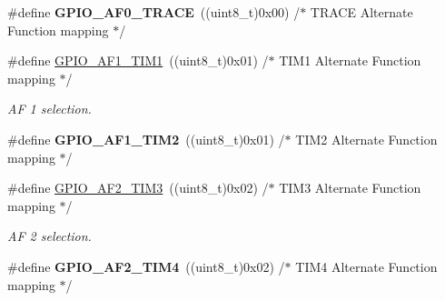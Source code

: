 \begin{DoxyCompactItemize}
\item 
\#define {\bfseries G\+P\+I\+O\+\_\+\+A\+F0\+\_\+\+T\+R\+A\+CE}~((uint8\+\_\+t)0x00)  /$\ast$ T\+R\+A\+C\+E Alternate Function mapping                          $\ast$/\hypertarget{group___g_p_i_o___alternate__function__selection_gab8c8f038d314b7bf2d62bce189d45877}{}\label{group___g_p_i_o___alternate__function__selection_gab8c8f038d314b7bf2d62bce189d45877}

\item 
\#define \hyperlink{group___g_p_i_o___alternate__function__selection_ga232695759304748cda241cc00e0680e5}{G\+P\+I\+O\+\_\+\+A\+F1\+\_\+\+T\+I\+M1}~((uint8\+\_\+t)0x01)  /$\ast$ T\+I\+M1 Alternate Function mapping $\ast$/\hypertarget{group___g_p_i_o___alternate__function__selection_ga232695759304748cda241cc00e0680e5}{}\label{group___g_p_i_o___alternate__function__selection_ga232695759304748cda241cc00e0680e5}

\begin{DoxyCompactList}\small\item\em AF 1 selection. \end{DoxyCompactList}\item 
\#define {\bfseries G\+P\+I\+O\+\_\+\+A\+F1\+\_\+\+T\+I\+M2}~((uint8\+\_\+t)0x01)  /$\ast$ T\+I\+M2 Alternate Function mapping $\ast$/\hypertarget{group___g_p_i_o___alternate__function__selection_ga4a124b0badec1580f1581a5fccd32ade}{}\label{group___g_p_i_o___alternate__function__selection_ga4a124b0badec1580f1581a5fccd32ade}

\item 
\#define \hyperlink{group___g_p_i_o___alternate__function__selection_ga41e7dab432740a5fff4084890764242f}{G\+P\+I\+O\+\_\+\+A\+F2\+\_\+\+T\+I\+M3}~((uint8\+\_\+t)0x02)  /$\ast$ T\+I\+M3 Alternate Function mapping $\ast$/\hypertarget{group___g_p_i_o___alternate__function__selection_ga41e7dab432740a5fff4084890764242f}{}\label{group___g_p_i_o___alternate__function__selection_ga41e7dab432740a5fff4084890764242f}

\begin{DoxyCompactList}\small\item\em AF 2 selection. \end{DoxyCompactList}\item 
\#define {\bfseries G\+P\+I\+O\+\_\+\+A\+F2\+\_\+\+T\+I\+M4}~((uint8\+\_\+t)0x02)  /$\ast$ T\+I\+M4 Alternate Function mapping $\ast$/\hypertarget{group___g_p_i_o___alternate__function__selection_gaea624d501cf9bbc28e01bcba9270b895}{}\label{group___g_p_i_o___alternate__function__selection_gaea624d501cf9bbc28e01bcba9270b895}


\end{DoxyCompactItemize}
